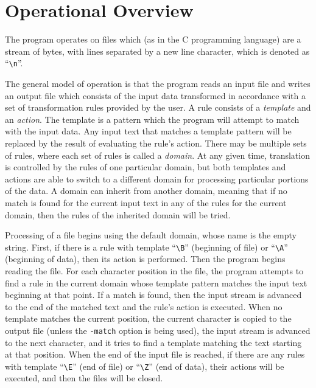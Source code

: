 

\section{Operational Overview}

The program operates on files which (as in the C programming language) are
a stream of bytes, with lines separated by a new line character, which is
denoted as ``\verb|\n|''.

The general model of operation is that the program reads an input file
and writes an output file which consists of the input data transformed in
accordance with a set of transformation rules provided by the user.
A rule consists of a {\em template} and an {\em action}.  The template
is a pattern which the program will attempt to match with the input data.
Any input text that matches a template pattern will be replaced by the
result of evaluating the rule's action.  There may be multiple sets of
rules, where each set of rules is called a {\em domain}.  At any given
time, translation is controlled by the rules of one particular domain, but
both templates and actions are able to switch to a different domain for
processing particular portions of the data.  A domain can inherit from
another domain, meaning that if no match is found for the current input
text in any of the rules for the current domain, then the rules of the
inherited domain will be tried.

Processing of a file begins using the default domain, whose name is the
empty string.  First, if there is a rule with template ``\verb/\B/''
(beginning of file) or ``\verb/\A/'' (beginning of data), then its action
is performed.  Then the program begins reading the file.  For each
character position in the file, the program attempts to find a rule in
the current domain whose template pattern matches the input text
beginning at that point.  If a match is found, then the input stream is
advanced to the end of the matched text and the rule's action is
executed.  When no template matches the current position, the current
character is copied to the output file (unless the \verb/-match/ option
is being used), the input stream is advanced to the next character, and
it tries to find a template matching the text starting at that position.
When the end of the input file is reached, if there are any rules with
template ``\verb/\E/'' (end of file) or ``\verb/\Z/'' (end of data),
their actions will be executed, and then the files will be closed.

